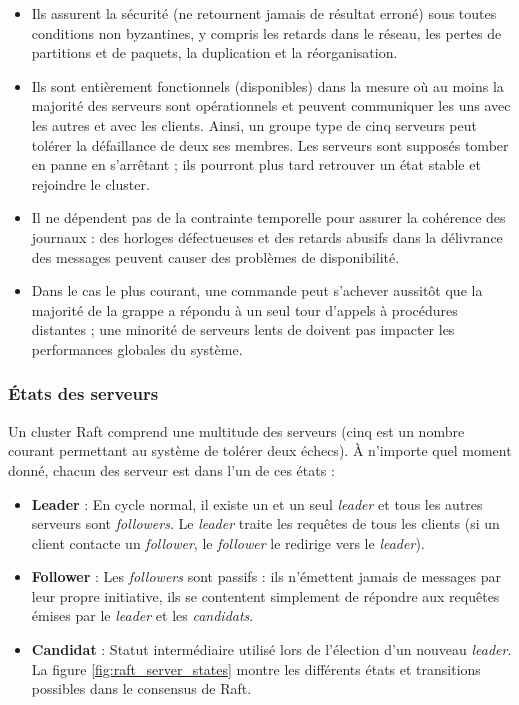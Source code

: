 \begin{itemize}
    \item Ils assurent la sécurité (ne retournent jamais de résultat erroné)
        sous toutes conditions non byzantines, y compris les retards dans le
        réseau, les pertes de partitions et de paquets, la duplication et
        la réorganisation.
    \item Ils sont entièrement fonctionnels (disponibles) dans la mesure où au
        moins la majorité des serveurs sont opérationnels et peuvent communiquer
        les uns avec les autres et avec les clients. Ainsi, un groupe type de
        cinq serveurs peut tolérer la défaillance de deux ses membres. Les
        serveurs sont supposés tomber en panne en s'arrêtant ; ils pourront plus
        tard retrouver un état stable et rejoindre le cluster.
    \item Il ne dépendent pas de la contrainte temporelle pour assurer la
        cohérence des journaux : des horloges défectueuses et des retards
        abusifs dans la délivrance des messages peuvent causer des problèmes de
        disponibilité. 
    \item Dans le cas le plus courant, une commande peut s'achever aussitôt que
        la majorité de la grappe a répondu à un seul tour d'appels à procédures
        distantes ; une minorité de serveurs lents de doivent pas impacter les
        performances globales du système.
\end{itemize}

\subsubsection{États des serveurs}

Un cluster Raft comprend une multitude des serveurs (cinq est un nombre courant
permettant au système de tolérer deux échecs). À n'importe quel moment donné,
chacun des serveur est dans l'un de ces états :

\begin{itemize}
    \item \textbf{Leader} :
        En cycle normal, il existe un et un seul \emph{leader} et tous les autres
        serveurs sont \emph{followers}. Le \emph{leader} traite les requêtes de
        tous les clients (si un client contacte un \emph{follower}, le
        \emph{follower} le redirige vers le \emph{leader}).
    \item \textbf{Follower} :
        Les \emph{followers} sont passifs : ils n'émettent jamais de messages par
        leur propre initiative, ils se contentent simplement de répondre aux
        requêtes émises par le \emph{leader} et les \emph{candidats}.
    \item \textbf{Candidat} :
        Statut intermédiaire utilisé lors de l'élection d'un nouveau
        \emph{leader}. La figure \ref{fig:raft_server_states} montre les différents états
        et transitions possibles dans le consensus de Raft.
\end{itemize}

